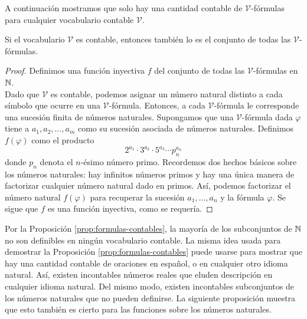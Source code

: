 \documentclass[12pt,a4paper]{book}
\newcommand{\VV}{\mathcal{V}}
\begin{document}
    A continuación mostramos que solo hay una cantidad contable de $\VV$-fórmulas para cualquier vocabulario contable $\VV$.

    \begin{proposicion}\label{prop:formulas-contables}
        Si el vocabulario $\VV$ es contable, entonces también lo es el conjunto de todas las $\VV$-fórmulas.
    \end{proposicion}
    \begin{proof}
        Definimos una función inyectiva $f$ del conjunto de todas las $\VV$-fórmulas en $\mathbb{N}$.\\
        Dado que $\VV$ es contable, podemos asignar un número natural distinto a cada símbolo que ocurre en una
        $\VV$-fórmula. Entonces, a cada $\VV$-fórmula le corresponde una sucesión finita de números naturales. Supongamos
        que una $\VV$-fórmula dada $\varphi$ tiene a $a_{1},a_{2},\dots,a_{m}$ como su sucesión asociada de números
        naturales. Definimos $f(\varphi)$ como el producto
        \begin{equation*}
            2^{a_{1}}\cdot 3^{a_{2}}\cdot 5^{a_{3}}\cdots p_{n}^{a_{n}}
        \end{equation*}
        donde $p_{n}$ denota el $n$-ésimo número primo. Recordemos dos hechos básicos sobre los números naturales: hay
        infinitos números primos y hay una única manera de factorizar cualquier número natural dado en primos. Así,
        podemos factorizar el número natural $f(\varphi)$ para recuperar la sucesión $a_{1},\dots,a_{n}$ y la fórmula
        $\varphi$. Se sigue que $f$ es una función inyectiva, como se requería.
    \end{proof}

    Por la Proposición \ref{prop:formulas-contables}, la mayoría de los subconjuntos de $\mathbb{N}$ no son definibles en ningún
    vocabulario contable. La misma idea usada para demostrar la Proposición \ref{prop:formulas-contables} puede usarse
    para mostrar que hay una cantidad contable de oraciones en español, o en cualquier otro idioma natural. Así, existen
    incontables números reales que eluden descripción en cualquier idioma natural. Del mismo modo, existen incontables
    subconjuntos de los números naturales que no pueden definirse. La siguiente proposición muestra que esto también es
    cierto para las funciones sobre los números naturales.
\end{document}
